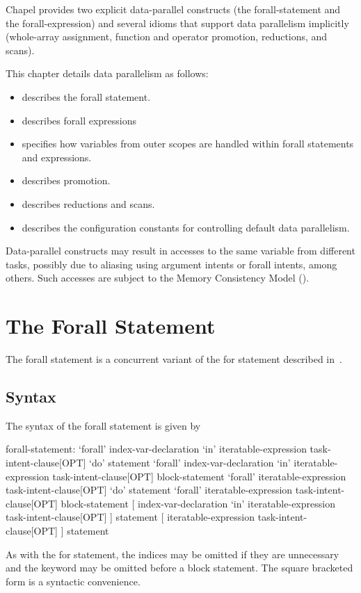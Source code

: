 \label{Data_Parallelism}

Chapel provides two explicit data-parallel constructs (the
forall-statement and the forall-expression) and several idioms that
support data parallelism implicitly (whole-array assignment, function
and operator promotion, reductions, and scans).

This chapter details data parallelism as follows:
\begin{itemize}
\item {} describes the forall statement.
\item {} describes forall expressions
\item {} specifies how variables from outer scopes
are handled within forall statements and expressions.
\item {} describes promotion.
\item {} describes reductions and scans.
\item {} describes the configuration constants for
controlling default data parallelism.
\end{itemize}       

Data-parallel constructs may result in accesses to the same variable
from different tasks, possibly due to aliasing using
 argument intents or forall intents, among others.
Such accesses are subject to the Memory Consistency Model
().

\section{The Forall Statement}
\label{Forall}

The forall statement is a concurrent variant of the for statement
described in~.

\subsection{Syntax}
\label{forall_syntax}

The syntax of the forall statement is given by
\begin{syntax}
forall-statement:
  `forall' index-var-declaration `in' iteratable-expression task-intent-clause[OPT] `do' statement
  `forall' index-var-declaration `in' iteratable-expression task-intent-clause[OPT] block-statement
  `forall' iteratable-expression task-intent-clause[OPT] `do' statement
  `forall' iteratable-expression task-intent-clause[OPT] block-statement
  [ index-var-declaration `in' iteratable-expression task-intent-clause[OPT] ] statement
  [ iteratable-expression task-intent-clause[OPT] ] statement
\end{syntax}
As with the for statement, the indices may be omitted if they are
unnecessary and the  keyword may be omitted before a block
statement.  The square bracketed form is a syntactic convenience.

